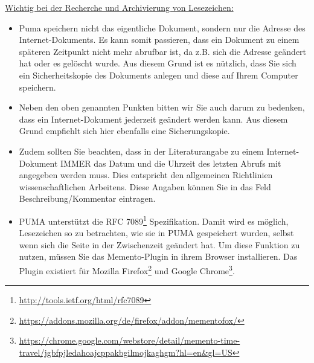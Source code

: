 \underline{Wichtig bei der Recherche und Archivierung von Lesezeichen:}
\begin{itemize}
    \item Puma speichern nicht das eigentliche Dokument, sondern nur die Adresse des Internet-Dokuments. Es kann somit passieren, dass ein Dokument zu einem späteren Zeitpunkt nicht mehr abrufbar ist, da z.B. sich die Adresse geändert hat oder es gelöscht wurde.  Aus diesem Grund ist es nützlich, dass Sie sich ein Sicherheitskopie des Dokuments anlegen und diese auf Ihrem Computer speichern.
    \item Neben den oben genannten Punkten bitten wir Sie auch darum zu bedenken, dass ein Internet-Dokument jederzeit geändert werden kann. Aus diesem Grund empfiehlt sich hier ebenfalls eine Sicherungskopie. 
    \item Zudem sollten Sie beachten, dass in der Literaturangabe zu einem Internet-Dokument IMMER das Datum und die Uhrzeit des letzten Abrufs mit angegeben werden muss. Dies entspricht den allgemeinen Richtlinien wissenschaftlichen Arbeitens. Diese Angaben können Sie in das Feld Beschreibung/Kommentar eintragen.
    \item PUMA unterstützt die RFC 7089\footnote{\url{http://tools.ietf.org/html/rfc7089}} Spezifikation. Damit wird es möglich, Lesezeichen so zu betrachten, wie sie in PUMA gespeichert wurden, selbst wenn sich die Seite in der Zwischenzeit geändert hat. Um diese Funktion zu nutzen, müssen Sie das Memento-Plugin in ihrem Browser installieren. Das Plugin existiert für Mozilla Firefox\footnote{\url{https://addons.mozilla.org/de/firefox/addon/mementofox/}} und Google Chrome\footnote{\url{https://chrome.google.com/webstore/detail/memento-time-travel/jgbfpjledahoajcppakbgilmojkaghgm?hl=en&gl=US}}. 
\end{itemize}

